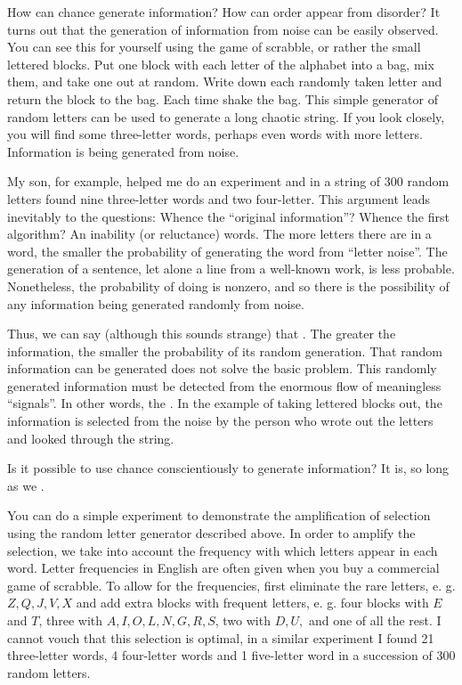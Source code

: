  How can chance generate information? How
can order appear from disorder? It turns out that the generation of
information from noise can be easily observed. You can see this for
yourself using the game of scrabble, or rather the small lettered blocks.
Put one block with each letter of the alphabet into a bag, mix them, and
take one out at random. Write down each randomly taken letter and
return the block to the bag. Each time shake the bag. This simple
generator of random letters can be used to generate a long chaotic
string. If you look closely, you will find some three-letter words, perhaps
even words with more letters. Information is being generated from noise.

My son, for example, helped me do an experiment and in a string of
300 random letters found nine three-letter words and two four-letter.
This argument leads inevitably to the questions: Whence the ``original
information''? Whence the first algorithm? An inability (or reluctance)
words. The more letters there are in a word, the smaller the probability
of generating the word from ``letter noise''. The generation of a sentence,
let alone a line from a well-known work, is less probable. Nonetheless,
the probability of doing is nonzero, and so there is the possibility of any
information being generated randomly from noise.

Thus, we can say (although this sounds strange) that . The greater the information, the smaller the
probability of its random generation. That random information can be
generated does not solve the basic problem. This randomly generated
information must be detected from the enormous flow of meaningless
``signals''. In other words, the . In the example of taking lettered blocks out, the information is selected
from the noise by the person who wrote out the letters and looked
through the string.

 Is it possible to use chance conscientiously to
generate information? It is, so long as we .

You can do a simple experiment to demonstrate the amplification of
selection using the random letter generator described above. In order to
amplify the selection, we take into account the frequency with which
letters appear in each word. Letter frequencies in English are often given
when you buy a commercial game of scrabble. To allow for the frequencies,
first eliminate the rare letters, e. g. $Z, Q, J, V, X$ and add extra
blocks with frequent letters, e. g. four blocks with $E$ and $T$, three with $A,
I, O, L, N, G, R, S$, two with $D, U,$ and one of all the rest. I cannot
vouch that this selection is optimal, in a similar experiment I found 21
three-letter words, 4 four-letter words and 1 five-letter word in
a succession of 300 random letters.


